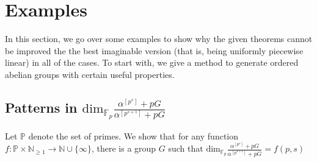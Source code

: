 \documentclass[a4paper,11pt]{article}
\newtheorem{proposition}[theorem]{Proposition}
\newcommand{\tx}{\textrm}
\renewcommand{\dim}{\tx{dim}}
\begin{document}



%

\section{Examples}\label{examples section}
In this section, we go over some examples to show why the given theorems cannot be improved the the best imaginable version (that is, being uniformly piecewise linear) in all of the cases. To start with, we give a method to generate ordered abelian groups with certain useful properties.
\subsection{Patterns in $\dim _{\mathbb{F}_p}\frac{\alpha^{[p^s]}+pG}{\alpha^{[p^{s+1}]}+pG}$}
Let $\mathbb{P}$ denote the set of primes. We show that for any function $f:\mathbb{P}\times \mathbb{N}_{\geq 1}\rightarrow\mathbb{N}\cup\{\infty\}$, there is a group $G$ such that $\dim _{\mathbb{F}_p}\frac{\alpha^{[p^s]}+pG}{\alpha^{[p^{s+1}]}+pG} = f(p,s)$
\end{document}

